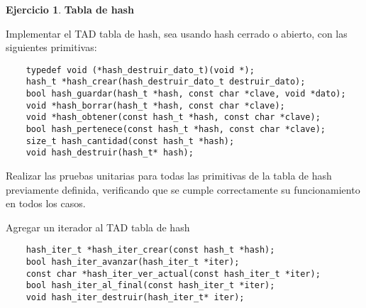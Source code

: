 \documentclass[11pt,a4paper]{article}
\theoremstyle{definition}
\newtheorem{ejercicio}{Ejercicio}[section]
\begin{document}
\begin{ejercicio}
\textbf{Tabla de hash}
\begin{partes}
\item Implementar el TAD tabla de hash, sea usando hash cerrado o
abierto, con las siguientes primitivas:
\begin{lstlisting}
    typedef void (*hash_destruir_dato_t)(void *);
    hash_t *hash_crear(hash_destruir_dato_t destruir_dato);
    bool hash_guardar(hash_t *hash, const char *clave, void *dato);
    void *hash_borrar(hash_t *hash, const char *clave);
    void *hash_obtener(const hash_t *hash, const char *clave);
    bool hash_pertenece(const hash_t *hash, const char *clave);
    size_t hash_cantidad(const hash_t *hash);
    void hash_destruir(hash_t* hash);
\end{lstlisting}

\item Realizar las pruebas unitarias para todas las primitivas de la tabla de
hash previamente definida, verificando que se cumple correctamente su
funcionamiento en todos los casos.

\item Agregar un iterador al TAD tabla de hash
\begin{lstlisting}
    hash_iter_t *hash_iter_crear(const hash_t *hash);
    bool hash_iter_avanzar(hash_iter_t *iter);
    const char *hash_iter_ver_actual(const hash_iter_t *iter);
    bool hash_iter_al_final(const hash_iter_t *iter);
    void hash_iter_destruir(hash_iter_t* iter);
\end{lstlisting}

\end{partes}
\end{ejercicio}
\end{document}
